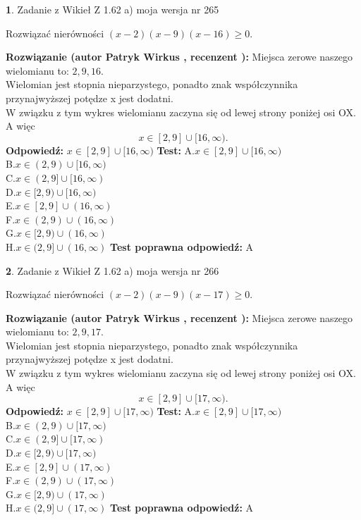 \documentclass[12pt, a4paper]{article}
\theoremstyle{definition} %
\newtheorem{zad}{}
\newcommand{\zadStart}[1]{\begin{zad}#1\newline}
\newcommand{\zadStop}{\end{zad}}
\newcommand{\rozwStart}[2]{\noindent \textbf{Rozwiązanie (autor #1 , recenzent #2): }\newline}
\newcommand{\rozwStop}{\newline}
\newcommand{\odpStart}{\noindent \textbf{Odpowiedź:}\newline}
\newcommand{\odpStop}{\newline}
\newcommand{\testStart}{\noindent \textbf{Test:}\newline}
\newcommand{\testStop}{\newline}
\newcommand{\kluczStart}{\noindent \textbf{Test poprawna odpowiedź:}\newline}
\newcommand{\kluczStop}{\newline}
\begin{document}
\zadStart{Zadanie z Wikieł Z 1.62 a) moja wersja nr 265}

Rozwiązać nierówności $(x-2)(x-9)(x-16)\ge0$.
\zadStop
\rozwStart{Patryk Wirkus}{}
Miejsca zerowe naszego wielomianu to: $2, 9, 16$.\\
Wielomian jest stopnia nieparzystego, ponadto znak współczynnika przy\linebreak najwyższej potędze x jest dodatni.\\ W związku z tym wykres wielomianu zaczyna się od lewej strony poniżej osi OX. A więc $$x \in [2,9] \cup [16,\infty).$$
\rozwStop
\odpStart
$x \in [2,9] \cup [16,\infty)$
\odpStop
\testStart
A.$x \in [2,9] \cup [16,\infty)$\\
B.$x \in (2,9) \cup [16,\infty)$\\
C.$x \in (2,9] \cup [16,\infty)$\\
D.$x \in [2,9) \cup [16,\infty)$\\
E.$x \in [2,9] \cup (16,\infty)$\\
F.$x \in (2,9) \cup (16,\infty)$\\
G.$x \in [2,9) \cup (16,\infty)$\\
H.$x \in (2,9] \cup (16,\infty)$
\testStop
\kluczStart
A
\kluczStop



\zadStart{Zadanie z Wikieł Z 1.62 a) moja wersja nr 266}

Rozwiązać nierówności $(x-2)(x-9)(x-17)\ge0$.
\zadStop
\rozwStart{Patryk Wirkus}{}
Miejsca zerowe naszego wielomianu to: $2, 9, 17$.\\
Wielomian jest stopnia nieparzystego, ponadto znak współczynnika przy\linebreak najwyższej potędze x jest dodatni.\\ W związku z tym wykres wielomianu zaczyna się od lewej strony poniżej osi OX. A więc $$x \in [2,9] \cup [17,\infty).$$
\rozwStop
\odpStart
$x \in [2,9] \cup [17,\infty)$
\odpStop
\testStart
A.$x \in [2,9] \cup [17,\infty)$\\
B.$x \in (2,9) \cup [17,\infty)$\\
C.$x \in (2,9] \cup [17,\infty)$\\
D.$x \in [2,9) \cup [17,\infty)$\\
E.$x \in [2,9] \cup (17,\infty)$\\
F.$x \in (2,9) \cup (17,\infty)$\\
G.$x \in [2,9) \cup (17,\infty)$\\
H.$x \in (2,9] \cup (17,\infty)$
\testStop
\kluczStart
A
\kluczStop
\end{document}
